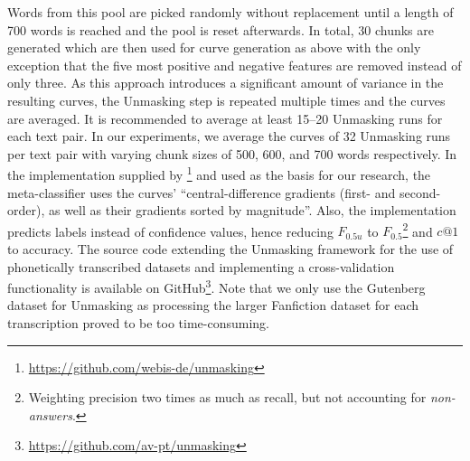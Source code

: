Words from this pool are picked randomly without replacement until a length of 700 words is reached and the pool is reset afterwards.
In total, 30 chunks are generated which are then used for curve generation as above with the only exception that the five most positive and negative features are removed instead of only three.
As this approach introduces a significant amount of variance in the resulting curves, the Unmasking step is repeated multiple times and the curves are averaged.
It is recommended to average at least 15--20 Unmasking runs for each text pair.
In our experiments, we average the curves of 32 Unmasking runs per text pair with varying chunk sizes of 500, 600, and 700 words respectively.
In the implementation supplied by \cite{bevendorff2019unmaskingShortTexts}\footnote{\url{https://github.com/webis-de/unmasking}} and used as the basis for our research, the meta-classifier uses the curves' ``central-difference gradients (first- and second-order), as well as their gradients sorted by magnitude''.
Also, the implementation predicts labels instead of confidence values, hence reducing $F_{0.5u}$ to $F_{0.5}$\footnote{Weighting precision two times as much as recall, but not accounting for \textit{non-answers}.} and $c@1$ to accuracy.
The source code extending the Unmasking framework for the use of phonetically transcribed datasets and implementing a cross-validation functionality is available on GitHub\footnote{\url{https://github.com/av-pt/unmasking}}.
Note that we only use the Gutenberg dataset for Unmasking as processing the larger Fanfiction dataset for each transcription proved to be too time-consuming.